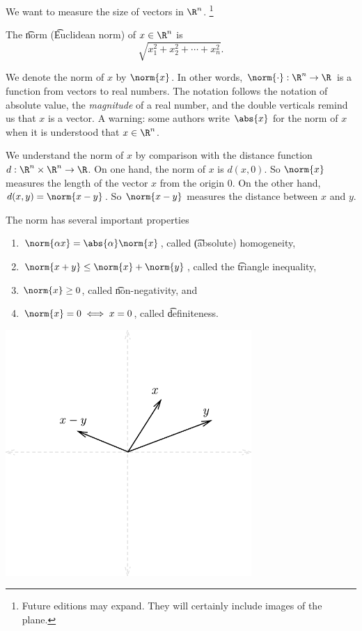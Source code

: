 
We want to measure the size of vectors in $\R^n$.
  \ifhmode\unskip\fi\footnote{
Future editions may expand. They will certainly include images of the plane.
  }

The \t{norm} (\t{Euclidean norm}) of $x \in \R^n$ is
  \[
\sqrt{x_1^2 + x_2^2 + \cdots + x_n^2}.
  \]

We denote the norm of $x$ by $\norm{x}$.
In other words, $\norm{\cdot}: \R^n \to \R$ is a function from vectors to real numbers.
The notation follows the notation of absolute value, the \textit{magnitude} of a real number, and the double verticals remind us that $x$ is a vector.
A warning: some authors write $\abs{x}$ for the norm of $x$ when it is understood that $x \in \R^n$.

We understand the norm of $x$ by comparison with the distance function $d: \R^n \times \R^n \to \R$.
On one hand, the norm of $x$ is $d(x, 0)$.
So $\norm{x}$ measures the length of the vector $x$ from the origin $0$.
On the other hand, $d(x, y) = \norm{x - y}$.
So $\norm{x - y}$ measures the distance between $x$ and $y$.

The norm has several important properties
  \begin{enumerate}
  \item $\norm{\alpha x} = \abs{\alpha}\norm{x}$, called \t{(absolute) homogeneity},
  \item $\norm{x + y} \leq \norm{x} + \norm{y}$, called the \t{triangle inequality},
  \item $\norm{x} \geq 0$, called \t{non-negativity}, and
  \item $\norm{x} = 0 \iff x = 0$, called \t{definiteness}.
  \end{enumerate}

\begin{center}
\includegraphics[width=0.7\textwidth]{graphics/x-y}
\end{center}
